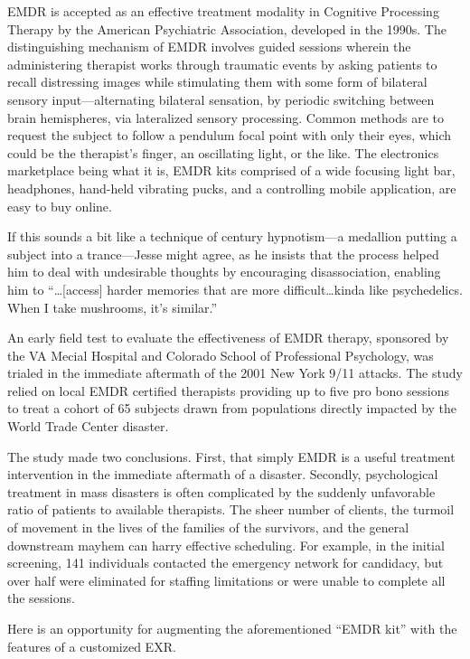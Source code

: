 \documentclass{UIdahoMastersThesis}
\begin{document}
\ac{EMDR} is accepted as an effective treatment modality in Cognitive Processing Therapy by the American Psychiatric Association, developed in the 1990s. The distinguishing mechanism of \ac{EMDR} involves guided sessions wherein the administering therapist works through traumatic events by asking patients to recall distressing images while stimulating them with some form of bilateral sensory input---alternating bilateral sensation, by periodic switching between brain hemispheres, via lateralized sensory processing. Common methods are to request the subject to follow a pendulum focal point with only their eyes, which could be the therapist's finger, an oscillating light, or the like. The electronics marketplace being what it is, \ac{EMDR} kits comprised of a wide focusing light bar, headphones, hand-held vibrating pucks, and a controlling mobile application, are easy to buy online. 

If this sounds a bit like a technique of  century hypnotism---a medallion putting a subject into a trance---Jesse might agree, as he insists that the process helped him to deal with undesirable thoughts by encouraging disassociation, enabling him to \enquote{\ldots[access] harder memories that are more difficult\ldots kinda like psychedelics. When I take mushrooms, it's similar.}

An early field test to evaluate the effectiveness of EMDR therapy, sponsored by the VA Mecial Hospital and Colorado School of Professional Psychology, was trialed in the immediate aftermath of the 2001 New York 9/11 attacks. The study relied on local EMDR certified therapists providing up to five pro bono sessions to treat a cohort of 65 subjects drawn from populations directly impacted by the World Trade Center disaster. 

The study made two conclusions. First, that simply EMDR is a useful treatment intervention in the immediate aftermath of a disaster. Secondly, psychological treatment in mass disasters is often complicated by the suddenly unfavorable ratio of patients to available therapists. The sheer number of clients, the turmoil of movement in the lives of the families of the survivors, and the general downstream mayhem can harry effective scheduling. For example, in the initial screening, 141 individuals contacted the emergency network for candidacy, but over half were eliminated for staffing limitations or were unable to complete all the sessions.

Here is an opportunity for augmenting the aforementioned ``EMDR kit'' with the features of a customized EXR.
\end{document}
